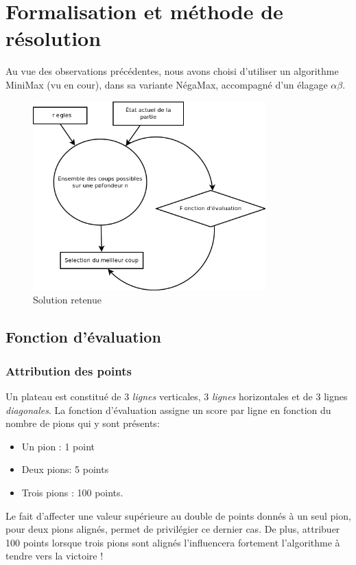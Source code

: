 \documentclass[a4paper,12pt]{article}
\begin{document}
\section{Formalisation et méthode de résolution}
Au vue des observations précédentes, nous avons choisi d'utiliser un algorithme MiniMax (vu en cour), dans sa variante NégaMax, accompagné d'un élagage $\alpha\beta$.
\begin{figure}[h]
    \includegraphics[width=0.8\textwidth]{./pix/methode.png}
    \centering
    \caption{Solution retenue}
\end{figure}

\subsection{Fonction d'évaluation}
\subsubsection{Attribution des points}
Un plateau est constitué de 3 \emph{lignes} verticales, 3 \emph{lignes} horizontales et de 3 lignes \emph{diagonales}. La fonction d'évaluation assigne un score par ligne en fonction du nombre de pions qui y sont présents:
\vspace{1em} %
\begin{itemize}
	\item Un pion : 1 point
	\item Deux pions: 5 points
	\item Trois pions : 100 points.
\end{itemize}
\vspace{1em} %
Le fait d'affecter une valeur supérieure au double de points donnés à un seul pion, pour deux pions alignés, permet de privilégier ce dernier cas. De plus, attribuer 100 points lorsque trois pions sont alignés l'influencera fortement l'algorithme à tendre vers la victoire !
\end{document}
